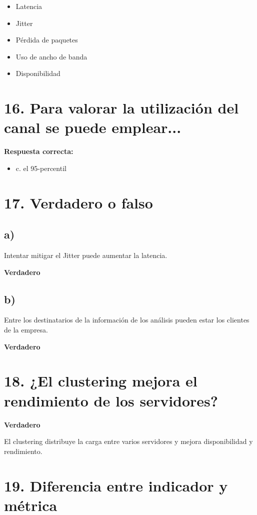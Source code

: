 \documentclass[12pt]{article}
\begin{document}
\begin{itemize}
    \item Latencia
    \item Jitter
    \item Pérdida de paquetes
    \item Uso de ancho de banda
    \item Disponibilidad
\end{itemize}

\section*{16. Para valorar la utilización del canal se puede emplear...}

\textbf{Respuesta correcta:}

\begin{itemize}
    \item c. el 95-percentil
\end{itemize}

\section*{17. Verdadero o falso}

\subsection*{a)}
Intentar mitigar el Jitter puede aumentar la latencia.

\textbf{Verdadero}

\subsection*{b)}
Entre los destinatarios de la información de los análisis pueden estar los clientes de la empresa.

\textbf{Verdadero}

\section*{18. ¿El clustering mejora el rendimiento de los servidores?}

\textbf{Verdadero}

El clustering distribuye la carga entre varios servidores y mejora disponibilidad y rendimiento.

\section*{19. Diferencia entre indicador y métrica}
\end{document}
